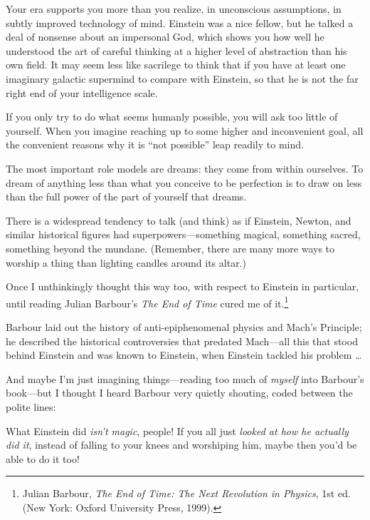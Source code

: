 {
 Your era supports you more than you realize, in unconscious
assumptions, in subtly improved technology of mind. Einstein was a nice
fellow, but he talked a deal of nonsense about an impersonal God, which
shows you how well he understood the art of careful thinking at a
higher level of abstraction than his own field. It may seem less like
sacrilege to think that if you have at least one imaginary galactic
supermind to compare with Einstein, so that he is not the far right end
of your intelligence scale.}

{
 If you only try to do what seems humanly possible, you will ask
too little of yourself. When you imagine reaching up to some higher and
inconvenient goal, all the convenient reasons why it is
``not possible'' leap readily to
mind.}

{
 The most important role models are dreams: they come from within
ourselves. To dream of anything less than what you conceive to be
perfection is to draw on less than the full power of the part of
yourself that dreams.}

\myendsectiontext


{
 There is a widespread tendency to talk (and think) as if Einstein,
Newton, and similar historical figures had superpowers---something
magical, something sacred, something beyond the mundane. (Remember,
there are many more ways to worship a thing than lighting candles
around its altar.) }

{
 Once I unthinkingly thought this way too, with respect to Einstein
in particular, until reading Julian Barbour's
\textit{The End of Time} cured me of it.\footnote{Julian Barbour, \textit{The End of Time: The Next Revolution in
Physics}, 1st ed. (New York: Oxford University Press, 1999).}}

{
 Barbour laid out the history of anti-epiphenomenal physics and
Mach's Principle; he described the historical
controversies that predated Mach---all this that stood behind Einstein
and was known to Einstein, when Einstein tackled his problem \ldots}

{
 And maybe I'm just imagining things---reading too
much of \textit{myself} into Barbour's book---but I
thought I heard Barbour very quietly shouting, coded between the polite
lines:}

{
 What Einstein did \textit{isn't magic}, people! If
you all just \textit{looked at how he actually did it}, instead of
falling to your knees and worshiping him, maybe then
you'd be able to do it too!}

